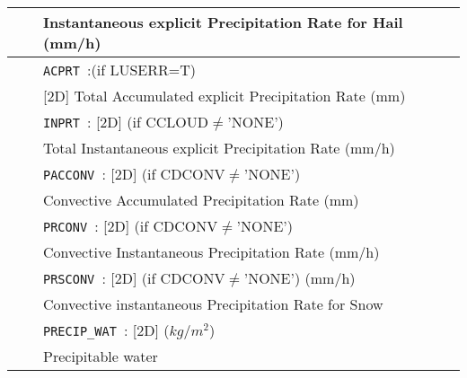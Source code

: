 \begin{center}
\begin{makeimage}
\begin{tabular}{|>{\centering}p{3cm}|>{\centering}p{2.5cm}|p{11cm}|}
&& Instantaneous explicit Precipitation Rate for Hail (mm/h) \\\cline{3-3}
& &{\tt ACPRT }:(if LUSERR=T)\\
&& [2D] Total Accumulated explicit Precipitation Rate (mm) \\\cline{3-3}
& &{\tt INPRT }: [2D] (if CCLOUD$\neq$'NONE')\\
&& Total Instantaneous explicit Precipitation Rate (mm/h) \\\cline{3-3}
& &{\tt PACCONV }: [2D] (if CDCONV$\neq$'NONE')\\
&&Convective Accumulated Precipitation Rate (mm)\\\cline{3-3}
& &{\tt PRCONV }: [2D] (if CDCONV$\neq$'NONE')\\
&& Convective Instantaneous Precipitation Rate (mm/h)\\\cline{3-3}
& &{\tt PRSCONV }: [2D] (if CDCONV$\neq$'NONE')  (mm/h) \\
&& Convective instantaneous Precipitation Rate for Snow  \\ \cline{3-3}
& &{\tt PRECIP\_WAT }: [2D]   ($kg/m^2$) \\
&&  Precipitable water \\ \hline
\end{tabular} 
\end{makeimage}
\end{center}

